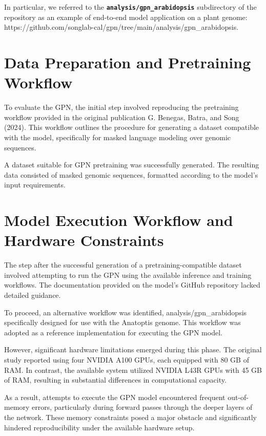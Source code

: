 \documentclass[
  a4paper,
  openany]{scrbook}
\begin{document}
In particular, we referred to the
\textbf{\texttt{analysis/gpn\_arabidopsis}} subdirectory of the
repository as an example of end-to-end model application on a plant
genome:
https://github.com/songlab-cal/gpn/tree/main/analysis/gpn\_arabidopsis.

\section{Data Preparation and Pretraining
Workflow}\label{data-preparation-and-pretraining-workflow}

To evaluate the GPN, the initial step involved reproducing the
pretraining workflow provided in the original publication G. Benegas,
Batra, and Song (2024). This workflow outlines the procedure for
generating a dataset compatible with the model, specifically for masked
language modeling over genomic sequences.

A dataset suitable for GPN pretraining was successfully generated. The
resulting data consisted of masked genomic sequences, formatted
according to the model's input requirements.

\section{Model Execution Workflow and Hardware
Constraints}\label{model-execution-workflow-and-hardware-constraints}

The step after the successful generation of a pretraining-compatible
dataset involved attempting to run the GPN using the available inference
and training workflows. The documentation provided on the model's GitHub
repository lacked detailed guidance.

To proceed, an alternative workflow was identified,
analysis/gpn\_arabidopsis specifically designed for use with the
Anatoptis genome. This workflow was adopted as a reference
implementation for executing the GPN model.

However, significant hardware limitations emerged during this phase. The
original study reported using four NVIDIA A100 GPUs, each equipped with
80 GB of RAM. In contrast, the available system utilized NVIDIA L43R
GPUs with 45 GB of RAM, resulting in substantial differences in
computational capacity.

As a result, attempts to execute the GPN model encountered frequent
out-of-memory errors, particularly during forward passes through the
deeper layers of the network. These memory constraints posed a major
obstacle and significantly hindered reproducibility under the available
hardware setup.
\end{document}
